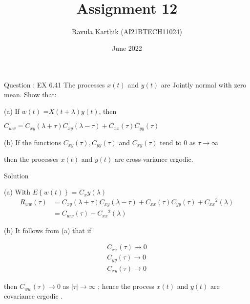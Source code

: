 \documentclass[journal,12pt,twocolumn]{beamer}
\title{Assignment 12}
\author{Ravula Karthik (AI21BTECH11024)}
\date {June 2022}
\providecommand{\cbrak}[1]{\ensuremath{\left\{#1\right\}}}
\begin{document}
	\begin{frame}
		\titlepage 
	\end{frame}
	
	\begin{frame}{Question : EX 6.41}
		The processes $x(t)$ and $y(t)$ are Jointly normal with zero mean. Show that: 
		
		(a) If $w(t)$ =$X(t+\lambda)y(t)$, then
		
		$ C_{ww} = C_{xy}(\lambda + \tau)C_{xy}(\lambda - \tau) +C_{xx}(\tau)C_{yy}(\tau) $
		
		(b) If the functions 
		$C_{xy}(\tau) ,C_{yy}(\tau)$ and $C_{xy}(\tau)$  tend to 0 as $\tau \rightarrow \infty$  
		
		then the processes $x(t)$ and $y(t)$ are cross-variance ergodic. 
		
	\end{frame}
	\begin{frame}{Solution}
		
		(a) With $E\cbrak{w(t)}$ = $C_xy(\lambda)$
		\begin{align}
			R_{ww}(\tau) &= C_{xy}(\lambda + \tau)C_{xy}(\lambda - \tau) +C_{xx}(\tau)C_{yy}(\tau) +C_{xx}{^2}(\lambda) \nonumber \\
			&= C_{ww}(\tau) + C_{xx}{^2}(\lambda) \nonumber
		\end{align} 
	
	\end{frame}
	
	\begin{frame}
	(b) It follows from (a) that if 
	
	\begin{align}
		C_{xx}(\tau) \rightarrow 0 \nonumber \\
		C_{yy}(\tau) \rightarrow 0 \nonumber \\
		C_{xy}(\tau) \rightarrow 0 \nonumber 
	\end{align} 
	
	then $C_{ww}(\tau) \rightarrow 0 $ as $|{\tau}| \rightarrow \infty$ ; hence the process $x(t)$ and $y(t)$ are covariance ergodic .
	\end{frame}
	
\end{document}
